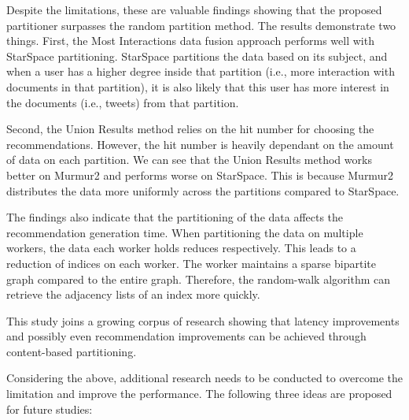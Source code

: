 Despite the limitations, these are valuable findings showing that the proposed partitioner surpasses the random partition method. The results demonstrate two things. First, the Most Interactions data fusion approach performs well with StarSpace partitioning. StarSpace partitions the data based on its subject, and when a user has a higher degree inside that partition (i.e., more interaction with documents in that partition), it is also likely that this user has more interest in the documents (i.e., tweets) from that partition. 


Second, the Union Results method relies on the hit number for choosing the recommendations. However, the hit number is heavily dependant on the amount of data on each partition. We can see that the Union Results method works better on Murmur2 and performs worse on StarSpace. This is because Murmur2 distributes the data more uniformly across the partitions compared to StarSpace.


The findings also indicate that the partitioning of the data affects the recommendation generation time. When partitioning the data on multiple workers, the data each worker holds reduces respectively. This leads to a reduction of indices on each worker. The worker maintains a sparse bipartite graph compared to the entire graph. Therefore, the random-walk algorithm can retrieve the adjacency lists of an index more quickly.


This study joins a growing corpus of research showing that latency improvements and possibly even recommendation improvements can be achieved through content-based partitioning.


Considering the above, additional research needs to be conducted to overcome the limitation and improve the performance. The following three ideas are proposed for future studies:

